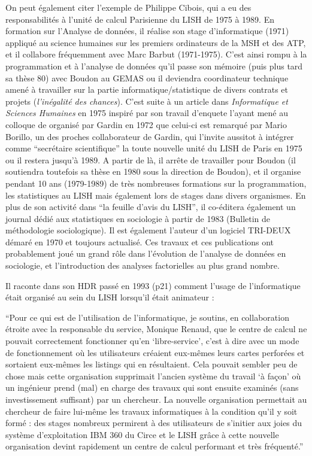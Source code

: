 On peut également citer l'exemple de Philippe Cibois, qui a eu des responsabilités à l'unité de calcul Parisienne du LISH de 1975 à 1989. En formation sur l’Analyse de données, il réalise son stage d’informatique (1971) appliqué au science humaines sur les premiers ordinateurs de la MSH et des ATP, et il collabore fréquemment avec Marc Barbut (1971-1975). C’est ainsi rompu à la programmation et à l’analyse de données qu’il passe son mémoire (puis plus tard sa thèse 80) avec Boudon au GEMAS ou il deviendra coordinateur technique amené à travailler sur la partie informatique/statistique de divers contrats et projets (\textit{l’inégalité des chances}). C’est suite à un article dans \textit{Informatique et Sciences Humaines} en 1975 inspiré par son travail d’enquete l’ayant mené au colloque de organisé par Gardin en 1972 que celui-ci est remarqué par Mario Borillo, un des proches collaborateur de Gardin, qui l’invite aussitot à intégrer comme \enquote{secrétaire scientifique} la toute nouvelle unité du LISH de Paris en 1975 ou il restera jusqu’à 1989. A partir de là, il arrête de travailler pour Boudon (il soutiendra toutefois sa thèse en 1980 sous la direction de Boudon), et il organise pendant 10 ans (1979-1989) de très nombreuses formations sur la programmation, les statistiques au LISH mais également lors de stages dans divers organismes. En plus de son activité dans \enquote{la feuille d’avis du LISH}, il co-éditera également un journal dédié aux statistiques en sociologie à partir de 1983 (Bulletin de méthodologie sociologique). Il est également l’auteur d’un logiciel TRI-DEUX démaré en 1970 et toujours actualisé. Ces travaux et ces publications ont probablement joué un grand rôle dans l’évolution de l’analyse de données en sociologie, et l’introduction des analyses factorielles au plus grand nombre.

Il raconte dans son HDR passé en 1993 (p21) comment l’usage de l’informatique était organisé au sein du LISH lorsqu’il était animateur  :

\enquote{Pour ce qui est de l'utilisation de l'informatique, je soutins, en collaboration étroite avec la responsable du service, Monique Renaud, que le centre de calcul ne pouvait correctement fonctionner qu'en \enquote{libre-service}, c'est à dire avec un mode de fonctionnement où les utilisateurs créaient eux-mêmes leurs cartes perforées et sortaient eux-mêmes les listings qui en résultaient. Cela pouvait sembler peu de chose mais cette organisation supprimait l'ancien système du travail \enquote{à  façon} où un ingénieur  prend (mal) en charge des travaux  qui sont ensuite examinés (sans investissement suffisant) par un chercheur. La nouvelle organisation permettait au chercheur de faire lui-même les travaux informatiques à la condition qu'il y soit formé : des stages nombreux permirent à des utilisateurs de s'initier aux joies du système d'exploitation IBM 360 du Circe et le LISH grâce à cette nouvelle organisation devint rapidement un centre de calcul performant et très fréquenté.}

